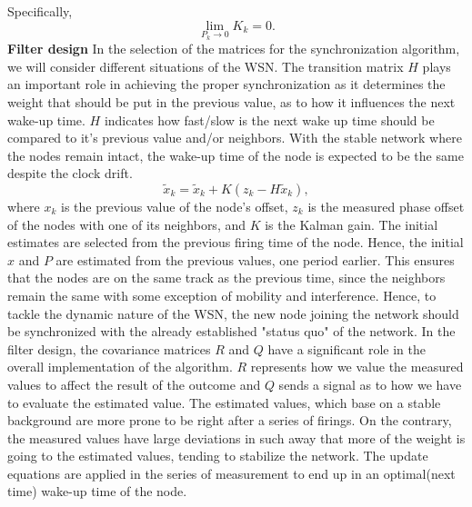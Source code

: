 \documentclass[journal]{IEEEtran}
\begin{document}
Specifically,
\begin{equation}
\mathop {\lim }\limits_{P_k \to 0 } {K_k} = 0.
\end{equation}
\textbf{Filter design} \newline
In the selection of the matrices for the synchronization algorithm,
we will consider different situations of the WSN.
\newline
The transition matrix $H$ plays an important role in achieving
the proper synchronization as it determines the weight that should
be put in the previous value, as to how it influences the next
wake-up time. $H$ indicates how fast/slow is the next wake up time should be compared
to it's previous value and/or neighbors. With the stable network where the nodes remain intact,
the wake-up time of the node is expected to be the same despite the
clock drift.
\begin{equation}
\tilde x_k = \tilde x_k + K(z_k-H\tilde x_k) \label{diff},
\end{equation}
where $x_k$ is the previous value of the node's offset, $z_k$ is the measured phase offset of the nodes with one of its neighbors,
and $K$ is the Kalman gain. \newline
The initial estimates are selected from the previous firing time of the node.
Hence, the initial $x$ and $P$ are estimated from the previous values, one period earlier.
This ensures that the nodes are on the same track as the previous time, since the neighbors
remain the same with some exception of mobility and interference.
Hence, to tackle the dynamic nature of the WSN, the
new node joining the network should be synchronized with the already
established "status quo" of the network. 
In the filter design, the covariance matrices $R$ and $Q$ have a significant
role in the overall implementation of the algorithm. $R$ represents how
we value the measured values to affect the result of the outcome and $Q$
sends a signal as to how we have to evaluate the estimated
value.
\newline The estimated values, which base on a stable background are more prone to be right after a
series of firings. On the contrary, the measured values have large
deviations in such away that more of the weight is going to the
estimated values, tending to stabilize the network.
\newline The update equations are applied in the series of measurement
to end up in an optimal(next time) wake-up time of the node.
\end{document}
